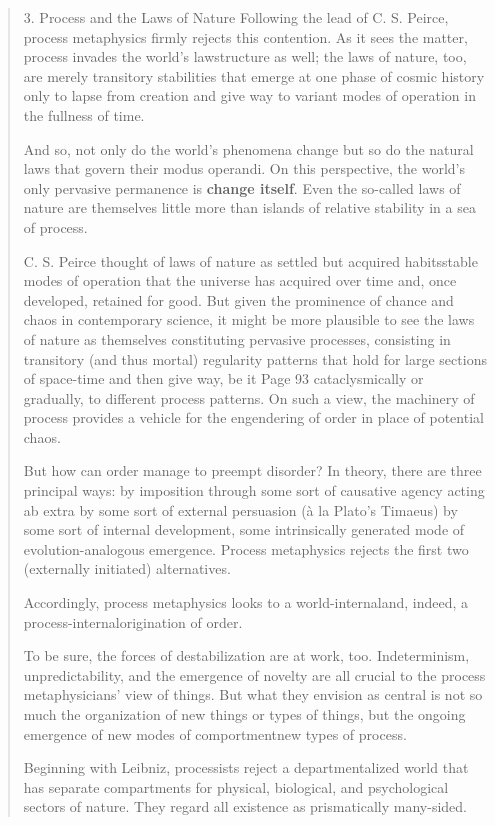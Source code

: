 \documentclass[a4paper]{Thesis}
\begin{document}
	\begin{quotation}
		3. Process and the Laws of Nature
		Following the lead of C. S. Peirce, process metaphysics
		firmly rejects this contention. As it sees the matter, process invades the world's lawstructure
		as well; the laws of nature, too, are merely transitory stabilities that emerge at
		one phase of cosmic history only to lapse from creation and give way to variant modes of
		operation in the fullness of time.
		
		And so, not only do the world's phenomena change but
		so do the natural laws that govern their modus operandi. On this perspective, the world's
		only pervasive permanence is \textbf{change itself}. Even the so-called laws of nature are
		themselves little more than islands of relative stability in a sea of process.
		
		C. S. Peirce thought of laws of nature as settled but acquired habitsstable modes of
		operation that the universe has acquired over time and, once developed, retained for
		good. But given the prominence of chance and chaos in contemporary science, it might be
		more plausible to see the laws of nature as themselves constituting pervasive processes,
		consisting in transitory (and thus mortal) regularity patterns that hold for large sections of
		space-time and then give way, be it
		Page 93
		cataclysmically or gradually, to different process patterns. On such a view, the machinery
		of process provides a vehicle for the engendering of order in place of potential chaos.
		
		But how can order manage to preempt disorder? In theory, there are three principal
		ways:
		by imposition through some sort of causative agency acting ab extra
		by some sort of external persuasion (à la Plato's Timaeus)
		by some sort of internal development, some intrinsically generated mode
		of evolution-analogous emergence.
		Process metaphysics rejects the first two (externally initiated) alternatives.
		
		Accordingly, process
		metaphysics looks to a world-internaland, indeed, a process-internalorigination of order.
		
		To be sure, the forces of destabilization are at work, too. Indeterminism, unpredictability,
		and the emergence of novelty are all crucial to the process metaphysicians' view of
		things. But what they envision as central is not so much the organization of new things or
		types of things, but the ongoing emergence of new modes of comportmentnew types of
		process.
		
		Beginning with Leibniz, processists reject a departmentalized world that has separate
		compartments for physical, biological, and psychological sectors of nature. They regard all
		existence as prismatically many-sided.
		
	\end{quotation}
	
\end{document}
